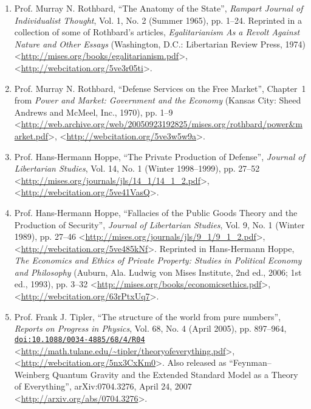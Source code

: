\documentclass[letterpaper,12pt]{article}
\begin{document}
\begin{enumerate}
\small
\item Prof. Murray N. Rothbard, ``The Anatomy of the State'', \emph{Rampart Journal of Individualist Thought}, Vol. 1, No. 2 (Summer 1965), pp. 1--24. Reprinted in a collection of some of Rothbard's articles, \emph{Egalitarianism As a Revolt Against Nature and Other Essays} (Washington, D.C.: Libertarian Review Press, 1974) \textless\url{http://mises.org/books/egalitarianism.pdf}\textgreater , \textless\url{http://webcitation.org/5ve3r05ti}\textgreater .

\item Prof. Murray N. Rothbard, ``Defense Services on the Free Market'', Chapter~1 from \emph{Power and Market: Government and the Economy} (Kansas City: Sheed Andrews and McMeel, Inc., 1970), pp. 1--9 \textless\url{http://web.archive.org/web/20050923192825/mises.org/rothbard/power&market.pdf}\textgreater , \textless\url{http://webcitation.org/5ve3w5w9a}\textgreater .

\item Prof. Hans-Hermann Hoppe, ``The Private Production of Defense'', \emph{Journal of Libertarian Studies}, Vol. 14, No. 1 (Winter 1998--1999), pp. 27--52 \textless\url{http://mises.org/journals/jls/14_1/14_1_2.pdf}\textgreater , \textless\url{http://webcitation.org/5ve41VasQ}\textgreater .

\item Prof. Hans-Hermann Hoppe, ``Fallacies of the Public Goods Theory and the Production of Security'', \emph{Journal of Libertarian Studies}, Vol. 9, No. 1 (Winter 1989), pp. 27--46 \textless\url{http://mises.org/journals/jls/9_1/9_1_2.pdf}\textgreater , \textless\url{http://webcitation.org/5ve485kNf}\textgreater . Reprinted in Hans-Hermann Hoppe, \emph{The Economics and Ethics of Private Property: Studies in Political Economy and Philosophy} (Auburn, Ala. Ludwig von Mises Institute, 2nd ed., 2006; 1st ed., 1993), pp. 3--32 \textless\url{http://mises.org/books/economicsethics.pdf}\textgreater , \textless\url{http://webcitation.org/63rPtxUq7}\textgreater .

\item Prof. Frank J. Tipler, ``The structure of the world from pure numbers'', \emph{Reports on Progress in Physics}, Vol. 68, No. 4 (April 2005), pp. 897--964, \href{http://dx.doi.org/10.1088/0034-4885/68/4/R04}{\nolinkurl{doi:10.1088/0034-4885/68/4/R04}} \textless\url{http://math.tulane.edu/~tipler/theoryofeverything.pdf}\textgreater , \textless\url{http://webcitation.org/5nx3CxKm0}\textgreater . Also released as ``Feynman--Weinberg Quantum Gravity and the Extended Standard Model as a Theory of Everything'', arXiv:0704.3276, April 24, 2007 \textless\url{http://arxiv.org/abs/0704.3276}\textgreater .
\end{enumerate}
\end{document}
